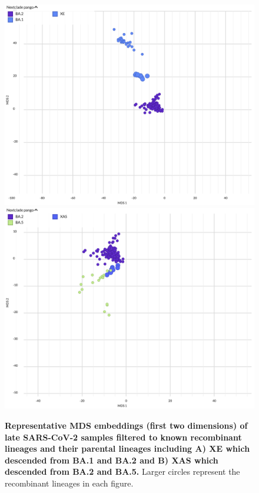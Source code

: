 \begin{figure}[!h]
\includegraphics[width=0.75\columnwidth]{figures/sarscov2-test-mds-reassortment-XE-BA1-BA2.png}\\
\includegraphics[width=0.75\columnwidth]{figures/sarscov2-test-mds-reassortment-XAS-BA2-BA5.png}
\caption{{\bf Representative MDS embeddings (first two dimensions) of late SARS-CoV-2 samples filtered to known recombinant lineages and their parental lineages including A) XE which descended from BA.1 and BA.2 and B) XAS which descended from BA.2 and BA.5.}
Larger circles represent the recombinant lineages in each figure.}\label{S_Fig_sarscov2_late_embeddings_mds_recombinant_examples}
\end{figure}
